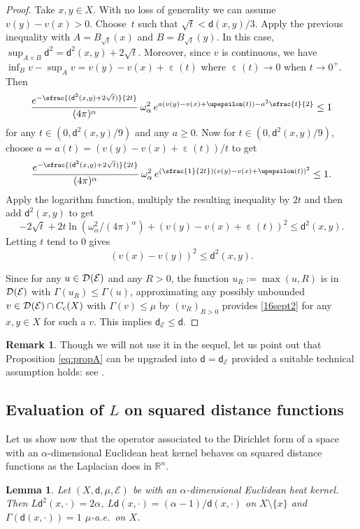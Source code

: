 \documentclass[JEP,XML,SOM,Unicode,published]{cedram}
\newcommand{\psfrac}[2]{\sfrac{(#1)}{#2}}
\newcommand{\Psfrac}[2]{(\sfrac{#1}{#2})}
\newcommand{\rmc}{\mathrm{c}}
\let\backslash\setminus
\newcommand{\NoChangel}[1]{%
\expandafter\let\csname old\string#1\endcsname=#1
\let#1=\relax
\newcommand{#1}{\mathcode`l="716C\csname old\string#1\endcsname\mathcode`l="7160 }%
}
\theoremstyle{plain}
\newtheorem{lemma}[theorem]{Lemma}
\theoremstyle{definition}
\newtheorem{remark}[theorem]{Remark}
\newcommand{\setR}{\mathbb{R}}
\newcommand{\cE}{\mathcal{E}}
\newcommand{\cD}{\mathcal{D}}
\let\eps\upepsilon
\newcommand{\loc}{\mathrm{loc}}\NoChangel{\loc}
\newcommand{\dist}{\mathsf{d}}
\begin{document}
\begin{proof}
Take $x,y \in X$. With no loss of generality we can assume $v(y)-v(x)>0$. Choose~$t$ such that $\sqrt{t}<\dist(x,y)/3$. Apply the previous inequality with $A=B_{\sqrt{t}}(x)$ and $B=B_{\sqrt{t}}(y)$. In this case, $\sup_{A\times B} \dist^2 = \dist^2(x,y) + 2 \sqrt{t}$. Moreover, since $v$ is continuous, we have $\inf_B v - \sup_A v = v(y)-v(x) + \eps(t)$ where $\eps(t)\to 0$ when $t \to 0^+$. Then
\[
\frac{e^{-\psfrac{\dist^2(x,y) + 2\sqrt{t}}{2t}}}{(4\pi)^\alpha}\, \omega_\alpha^2\, e^{a (v(y)-v(x) + \eps(t)) - a^2 \sfrac{t}{2}} \le 1
\]
for any $t \in (0,\dist^2(x,y)/9)$ and any $a \ge 0$. Now for $t \in (0,\dist^2(x,y)/9)$, choose $a=a(t)=(v(y)-v(x) + \eps(t))/t$ to get
\[
\frac{e^{-\psfrac{\dist^2(x,y) + 2\sqrt{t}}{2t}}}{(4\pi)^\alpha}\, \omega_\alpha^2\, e^{\Psfrac{1}{2t}(v(y)-v(x) + \eps(t))^2} \le 1.
\]
Apply the logarithm function, multiply the resulting inequality by $2t$ and then add $\dist^2(x,y)$ to get
\[
-2\sqrt{t} + 2t \ln(\omega_\alpha^2/(4\pi)^\alpha) + (v(y)-v(x) + \eps(t))^2 \le \dist^2(x,y).
\]
Letting $t$ tend to $0$ gives
\begin{equation}\label{16sept2}
(v(x)-v(y))^2 \le \dist^2(x,y).
\end{equation}

Since for any $u \in \cD_{\loc}(\cE)$ and any $R>0$, the function $u_R:=\max(u,R)$ is in $\cD_{\loc}(\cE)$ with $\Gamma(u_R)\le \Gamma(u)$, approximating any possibly unbounded $v \in \cD_{\loc}(\cE)\cap C_\rmc(X)$ with $\Gamma(v) \le \mu$ by $(v_R)_{R>0}$ provides \eqref{16sept2} for any $x,y \in X$ for such a $v$. This implies $\dist_\cE \le \dist$.
\end{proof}

\begin{remark}
Though we will not use it in the sequel, let us point out that Proposition \ref{eq:propA} can be upgraded into $\dist=\dist_\cE$ provided a suitable technical assumption holds: see \cite[Th.\,2.5\,(I)]{terElstRobinsonSikora}.
\end{remark}

\subsection{Evaluation of $L$ on squared distance functions}

Let us show now that the operator associated to the Dirichlet form of a space with an $\alpha$-dimensional Euclidean heat kernel behaves on squared distance functions as the Laplacian does in $\setR^n$.

\begin{lemma}\label{lem:Ld^2}
Let $(X,\dist,\mu,\cE)$ be with an $\alpha$-dimensional Euclidean heat kernel. Then $L\dist^2(x,\cdot)=2\alpha$, $L\dist(x,\cdot)=(\alpha-1)/\dist(x,\cdot)$ on $X\backslash \{x\}$ and $\Gamma(\dist(x,\cdot))=1$ $\mu$-a.e.\ on $X$.
\end{lemma}
\end{document}
